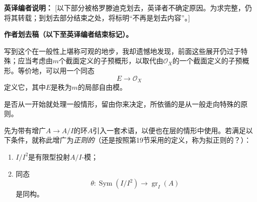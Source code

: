 \begingroup
{}
\noindent\textbf{英译编者说明：} [以下部分被格罗滕迪克划去，英译者不确定原因。为求完整，仍将其转载；到划去部分结束之处，将标明“不再是划去内容”。]

\def\Sym{\operatorname{Sym}}
\def\gr{\operatorname{gr}}
\def\im{\operatorname{im}}
\def\Spec{\operatorname{Spec}}
\def\m{\mathfrak m}
\def\n{\mathfrak n}
\def\Oa{\mathcal O}
\def\Pp{\mathcal P}
\par\medskip\noindent\textbf{作者划去稿（以下至英译编者结束标记）。}\par
写到这个在一般性上堪称可观的地步，我却遗憾地发现，前面这些展开仍过于特殊；应当考虑由$m$个截面定义的子预概形，以取代由$\mathcal O_X$的一个截面定义的子预概形。等价地，可以用一个同态
\[
E\longrightarrow\mathcal O_X
\]
定义它，其中$E$是秩为$m$的局部自由模。

是否从一开始就处理一般情形，留由你来决定，所依循的是从一般走向特殊的原则。

先为带有增广$A\to A/I$的环$A$引入一套术语，以便也在层的情形中使用。若满足以下条件，就称此增广为\emph{正则的}（还是按照第19节采用的定义，称为拟正则的？）：
\begin{enumerate}
\item[(a)] $I/I^2$是有限型投射$A/I$-模；
\item[(b)] 同态
\[
\theta:\operatorname{Sym}(I/I^2)\longrightarrow\operatorname{gr}_I(A)
\]
是同构。
\end{enumerate}

